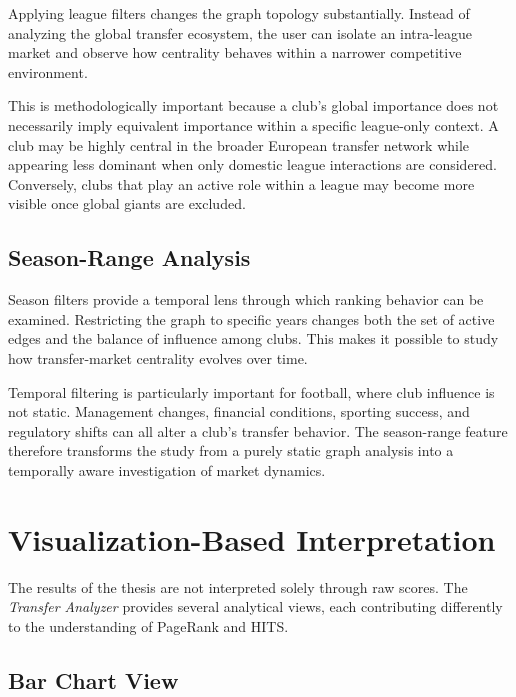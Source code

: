 Applying league filters changes the graph topology substantially. Instead of analyzing the global transfer ecosystem, the user can isolate an intra-league market and observe how centrality behaves within a narrower competitive environment.

This is methodologically important because a club's global importance does not necessarily imply equivalent importance within a specific league-only context. A club may be highly central in the broader European transfer network while appearing less dominant when only domestic league interactions are considered. Conversely, clubs that play an active role within a league may become more visible once global giants are excluded.

\subsection{Season-Range Analysis}
\label{subsec:results_seasons}

Season filters provide a temporal lens through which ranking behavior can be examined. Restricting the graph to specific years changes both the set of active edges and the balance of influence among clubs. This makes it possible to study how transfer-market centrality evolves over time.

Temporal filtering is particularly important for football, where club influence is not static. Management changes, financial conditions, sporting success, and regulatory shifts can all alter a club's transfer behavior. The season-range feature therefore transforms the study from a purely static graph analysis into a temporally aware investigation of market dynamics.


\section{Visualization-Based Interpretation}
\label{sec:results_visualization}

The results of the thesis are not interpreted solely through raw scores. The \textit{Transfer Analyzer} provides several analytical views, each contributing differently to the understanding of PageRank and HITS.

\subsection{Bar Chart View}
\label{subsec:results_bar_chart}

